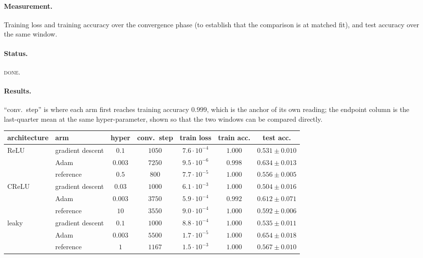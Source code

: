 \documentclass{article} %
\theoremstyle{plain}
\theoremstyle{definition}
\theoremstyle{remark}
\begin{document}
\paragraph{Measurement.}
Training loss and training accuracy over the convergence phase (to establish that the comparison is
at matched fit), and test accuracy over the same window.

\paragraph{Status.} \textsc{done}.

\paragraph{Results.}
``conv.\ step'' is where each arm first reaches training accuracy $0.999$, which is the anchor of
its own reading; the endpoint column is the last-quarter mean at the same hyper-parameter, shown so
that the two windows can be compared directly.

\begin{center}\small
\begin{tabular}{llccccc}
\toprule
architecture & arm & hyper & conv.\ step & train loss & train acc. & test acc. \\
\midrule
ReLU   & gradient descent & $0.1$    & $1050$ & $7.6\cdot10^{-4}$ & $1.000$ & $0.531 \pm 0.010$ \\
       & Adam             & $0.003$  & $7250$ & $9.5\cdot10^{-6}$ & $0.998$ & $\mathbf{0.634 \pm 0.013}$ \\
       & reference        & $0.5$    & $800$  & $7.7\cdot10^{-5}$ & $1.000$ & $0.556 \pm 0.005$ \\
\midrule
CReLU  & gradient descent & $0.03$   & $1000$ & $6.1\cdot10^{-3}$ & $1.000$ & $0.504 \pm 0.016$ \\
       & Adam             & $0.003$  & $3750$ & $5.9\cdot10^{-4}$ & $0.992$ & $\mathbf{0.612 \pm 0.071}$ \\
       & reference        & $10$     & $3550$ & $9.0\cdot10^{-4}$ & $1.000$ & $0.592 \pm 0.006$ \\
\midrule
leaky  & gradient descent & $0.1$    & $1000$ & $8.8\cdot10^{-4}$ & $1.000$ & $0.535 \pm 0.011$ \\
       & Adam             & $0.003$  & $5500$ & $1.7\cdot10^{-5}$ & $1.000$ & $\mathbf{0.654 \pm 0.018}$ \\
       & reference        & $1$      & $1167$ & $1.5\cdot10^{-3}$ & $1.000$ & $0.567 \pm 0.010$ \\
\bottomrule
\end{tabular}
\end{center}
\end{document}
